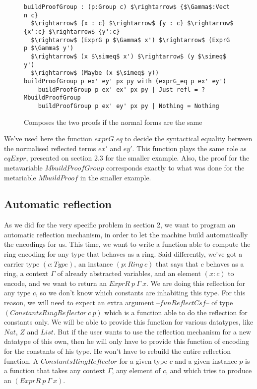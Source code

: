\begin{figure}[H]
\figrule
\begin{center}
\begin{lstlisting}
buildProofGroup : (p:Group c) $\rightarrow$ {$\Gamma$:Vect n c} 
  $\rightarrow$ {x : c} $\rightarrow$ {y : c} $\rightarrow$ {x':c} $\rightarrow$ {y':c} 
  $\rightarrow$ (ExprG p $\Gamma$ x') $\rightarrow$ (ExprG p $\Gamma$ y') 
  $\rightarrow$ (x $\simeq$ x') $\rightarrow$ (y $\simeq$ y') 
  $\rightarrow$ (Maybe (x $\simeq$ y))
buildProofGroup p ex' ey' px py with (exprG_eq p ex' ey')
    buildProofGroup p ex' ex' px py | Just refl = ?MbuildProofGroup
    buildProofGroup p ex' ey' px py | Nothing = Nothing
\end{lstlisting}
\end{center}
\caption{Composes the two proofs if the normal forms are the same}
\label{buildProofGroup}
\figrule
\end{figure}
We've used here the function $exprG\_eq$ to decide the syntactical equality between the normalised reflected terms $ex'$ and $ey'$. This function plays the same role as $eqExpr$, presented on section 2.3 for the smaller example. Also, the proof for the metavariable $MbuildProofGroup$ corresponds exactly to what was done for the metariable $MbuildProof$ in the smaller example.


\subsection {Automatic reflection}

As we did for the very specific problem in section 2, we want to program an automatic reflection mechanism, in order to let the machine build automatically the encodings for us. This time, we want to write a function able to compute the ring encoding for any type that behaves as a ring. Said differently, we've got a carrier type $(c:Type)$, an instance $(p:Ring\ c)$ that says that $c$ behaves as a ring, a context $\Gamma$ of already abstracted variables, and an element $(x:c)$ to encode, and we want to return an $ExprR\ p\ \Gamma\ x$.
We are doing this reflection for any type $c$, so we don't know which constants are inhabiting this type. For this reason, we will need to expect an extra argument --$funReflectCsf$-- of type $(ConstantsRingReflector\ c\ p)$ which is a function able to do the reflection for constants only. We will be able to provide this function for various datatypes, like $Nat$, $Z$ and $List$. But if the user wants to use the reflection mechanism for a new datatype of this own, then he will only have to provide this function of encoding for the constants of his type. He won't have to rebuild the entire reflection function.
A $ConstantsRingReflector$ for a given type $c$ and a given instance $p$ is a function that takes any context $\Gamma$, any element of $c$, and which tries to produce an $(ExprR\ p\ \Gamma\ x)$.

